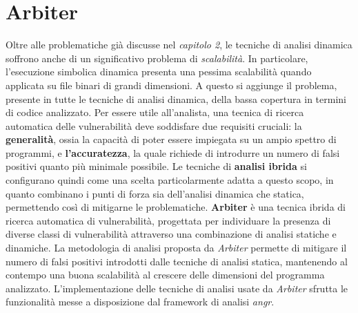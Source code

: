 \documentclass[../main.tex]{subfiles}
\begin{document}
\section{Arbiter}
Oltre alle problematiche già discusse nel \textit{capitolo 2}, le tecniche di analisi dinamica soffrono anche di un significativo problema di \textit{scalabilità}. 
In particolare, l'esecuzione simbolica dinamica presenta una pessima scalabilità quando applicata su file binari di grandi dimensioni. 
A questo si aggiunge il problema, presente in tutte le tecniche di analisi dinamica, della bassa copertura in termini di codice analizzato.
Per essere utile all'analista, una tecnica di ricerca automatica delle vulnerabilità deve soddisfare due requisiti cruciali: la \textbf{generalità}, ossia la capacità di poter essere impiegata
su un ampio spettro di programmi, e \textbf{l'accuratezza}, la quale richiede di introdurre un numero di falsi positivi quanto più minimale possibile.
Le tecniche di \textbf{analisi ibrida} si configurano quindi come una scelta particolarmente adatta a questo scopo, in quanto combinano i punti di forza sia dell'analisi dinamica che statica, permettendo così di mitigarne
le problematiche. \textbf{Arbiter} \cite{Arbier} è una tecnica ibrida di ricerca automatica di vulnerabilità, progettata per individuare la presenza di diverse classi di vulnerabilità attraverso una combinazione di analisi statiche e dinamiche.
La metodologia di analisi proposta da \textit{Arbiter} permette di mitigare il numero di falsi positivi introdotti dalle tecniche di analisi statica, mantenendo al contempo una buona scalabilità al crescere delle dimensioni del programma analizzato.
L'implementazione delle tecniche di analisi usate da \textit{Arbiter} sfrutta le funzionalità messe a disposizione dal framework di analisi \textit{angr}.
\newpage
\end{document}
